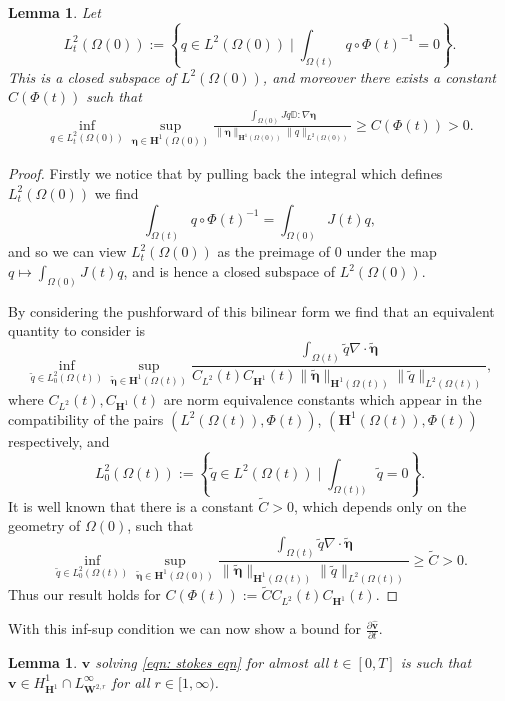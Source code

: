 \documentclass[a4paper]{amsart}
\numberwithin{equation}{section}
\newcommand{\ddt}[1]{\frac{\partial #1}{\partial t}}
\newcommand{\grad}{\nabla}
\newcommand{\Div}{\nabla \cdot}
\theoremstyle{plain}
\newtheorem{lemma}[theorem]{Lemma}
\newcommand{\mbf}[1]{\mathbf{#1}}
\newcommand{\mbb}[1]{\mathbb{#1}}
\begin{document}
\begin{lemma}
    Let 
    \[ L_t^2(\Omega(0)) := \left\{ q \in L^2(\Omega(0)) \mid \int_{\Omega(t)} q \circ \Phi(t)^{-1} = 0 \right\}. \]
    This is a closed subspace of $L^2(\Omega(0))$, and moreover there exists a constant $C(\Phi(t))$ such that
    \begin{align}
        \inf_{q \in L_t^2(\Omega(0))} \sup_{\boldsymbol{\eta} \in \mbf{H}^1(\Omega(0))} \frac{\int_{\Omega(0)} J q \mbb{D}: \grad \boldsymbol{\eta}}{\|\boldsymbol{\eta}\|_{\mbf{H}^1(\Omega(0))} \|q \|_{L^2(\Omega(0))}} \geq C(\Phi(t)) > 0.
    \end{align}
\end{lemma}
\begin{proof}
    Firstly we notice that by pulling back the integral which defines $L_t^2(\Omega(0))$ we find
    \[ \int_{\Omega(t)} q \circ \Phi(t)^{-1} = \int_{\Omega(0)} J(t) q, \]
    and so we can view $L_t^2(\Omega(0))$ as the preimage of $0$ under the map $q \mapsto \int_{\Omega(0)} J(t) q$, and is hence a closed subspace of $L^2(\Omega(0))$.

    By considering the pushforward of this bilinear form we find that an equivalent quantity to consider is
    \[ \inf_{\widetilde{q} \in L_0^2(\Omega(t))} \sup_{\widetilde{\boldsymbol{\eta}} \in \mbf{H}^1(\Omega(t))} \frac{\int_{\Omega(t)} \widetilde{q} \Div \widetilde{\boldsymbol{\eta}}}{C_{L^2}(t)C_{\mbf{H}^1}(t)\|\widetilde{\boldsymbol{\eta}}\|_{\mbf{H}^1(\Omega(t))} \|\widetilde{q} \|_{L^2(\Omega(t))}},  \]
    where $C_{L^2}(t), C_{\mbf{H}^1}(t)$ are norm equivalence constants which appear in the compatibility of the pairs $(L^2(\Omega(t)), \Phi(t))$, $(\mbf{H}^1(\Omega(t)), \Phi(t))$ respectively, and
    \[ L^2_0(\Omega(t)) := \left\{ \widetilde{q} \in L^2(\Omega(t)) \mid \int_{\Omega(t))} \widetilde{q} = 0\right\}. \]
    It is well known that there is a constant $\widetilde{C} > 0$, which depends only on the geometry of $\Omega(0)$, such that
    \[ \inf_{\widetilde{q} \in L_0^2(\Omega(t))} \sup_{\widetilde{\boldsymbol{\eta}} \in \mbf{H}^1(\Omega(0))} \frac{\int_{\Omega(t)} \widetilde{q} \Div \widetilde{\boldsymbol{\eta}}}{\|\widetilde{\boldsymbol{\eta}}\|_{\mbf{H}^1(\Omega(t))} \|\widetilde{q} \|_{L^2(\Omega(t))}}  \geq \widetilde{C} > 0.\]
    Thus our result holds for $C(\Phi(t)) := \widetilde{C}C_{L^2}(t)C_{\mbf{H}^1}(t)$.
\end{proof}
With this inf-sup condition we can now show a bound for $\ddt{\widehat{\mbf{v}}}$.
\begin{lemma}
    $\mbf{v}$ solving \eqref{eqn: stokes eqn} for almost all $t \in [0,T]$ is such that $\mbf{v} \in H^1_{\mbf{H}^1} \cap L^\infty_{\mbf{W}^{2,r}}$ for all $r \in [1,\infty)$.
\end{lemma}
\end{document}
